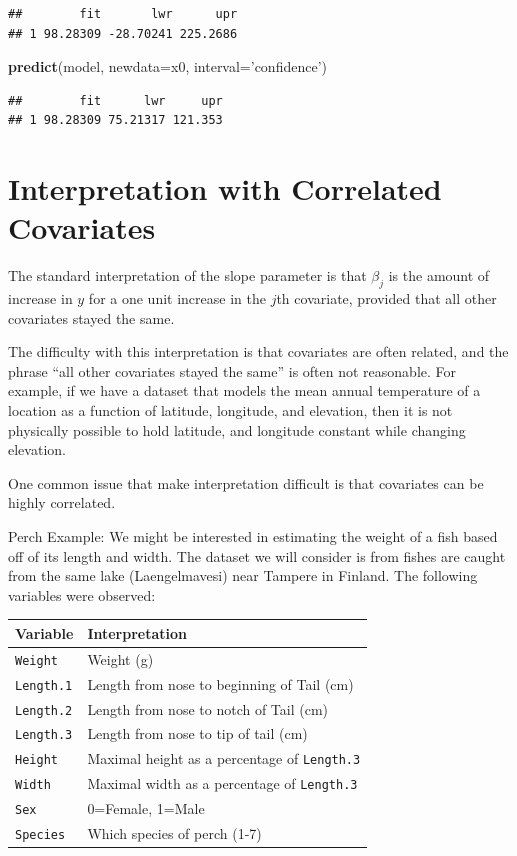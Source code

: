 \documentclass[]{book}
\newenvironment{Shaded}{\begin{snugshade}}{\end{snugshade}}
\newcommand{\KeywordTok}[1]{\textcolor[rgb]{0.13,0.29,0.53}{\textbf{{#1}}}}
\newcommand{\DataTypeTok}[1]{\textcolor[rgb]{0.13,0.29,0.53}{{#1}}}
\newcommand{\StringTok}[1]{\textcolor[rgb]{0.31,0.60,0.02}{{#1}}}
\newcommand{\NormalTok}[1]{{#1}}
\theoremstyle{definition}
\theoremstyle{definition}
\theoremstyle{remark}
\begin{document}
\begin{verbatim}
##        fit       lwr      upr
## 1 98.28309 -28.70241 225.2686
\end{verbatim}

\begin{Shaded}
\begin{Highlighting}[]
\KeywordTok{predict}\NormalTok{(model, }\DataTypeTok{newdata=}\NormalTok{x0, }\DataTypeTok{interval=}\StringTok{'confidence'}\NormalTok{)}
\end{Highlighting}
\end{Shaded}

\begin{verbatim}
##        fit      lwr     upr
## 1 98.28309 75.21317 121.353
\end{verbatim}

\section{Interpretation with Correlated
Covariates}\label{interpretation-with-correlated-covariates}

The standard interpretation of the slope parameter is that \(\beta_{j}\)
is the amount of increase in \(y\) for a one unit increase in the
\(j\)th covariate, provided that all other covariates stayed the same.

The difficulty with this interpretation is that covariates are often
related, and the phrase ``all other covariates stayed the same'' is
often not reasonable. For example, if we have a dataset that models the
mean annual temperature of a location as a function of latitude,
longitude, and elevation, then it is not physically possible to hold
latitude, and longitude constant while changing elevation.

One common issue that make interpretation difficult is that covariates
can be highly correlated.

Perch Example: We might be interested in estimating the weight of a fish
based off of its length and width. The dataset we will consider is from
fishes are caught from the same lake (Laengelmavesi) near Tampere in
Finland. The following variables were observed:

\begin{longtable}[]{@{}ll@{}}
\toprule
Variable & Interpretation\tabularnewline
\midrule
\endhead
\texttt{Weight} & Weight (g)\tabularnewline
\texttt{Length.1} & Length from nose to beginning of Tail
(cm)\tabularnewline
\texttt{Length.2} & Length from nose to notch of Tail
(cm)\tabularnewline
\texttt{Length.3} & Length from nose to tip of tail (cm)\tabularnewline
\texttt{Height} & Maximal height as a percentage of
\texttt{Length.3}\tabularnewline
\texttt{Width} & Maximal width as a percentage of
\texttt{Length.3}\tabularnewline
\texttt{Sex} & 0=Female, 1=Male\tabularnewline
\texttt{Species} & Which species of perch (1-7)\tabularnewline
\bottomrule
\end{longtable}
\end{document}
